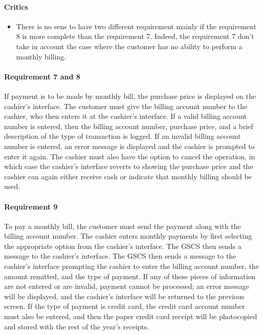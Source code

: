 \begin{framed}
    \paragraph{Critics} 
    \begin{itemize}
        \item There is no sens to have two different requirement mainly
            if the requirement 8 is more complete than the requirement
            7. Indeed, the requirement 7 don't take in account the
            case where the customer has no ability to perform a
            monthly billing.
    \end{itemize}

    \paragraph{Requirement 7 and 8} If payment is to be made by monthly bill, the
    purchase price is displayed on the cashier's interface.
    The customer must give the billing account number
    to the cashier, who then enters it at the cashier's interface. If a valid
    billing account number is entered, then the billing account number, purchase
    price, and a brief description of the type of transaction is logged. If an
    invalid billing account number is entered, an error message is displayed
    and the cashier is prompted to enter it again. The cashier must also have
    the option to cancel the operation, in which case the cashier's interface
    reverts to showing the purchase price and the cashier can again either
    receive cash or indicate that monthly billing should be used.
\end{framed}

\paragraph{Requirement 9} To pay a monthly bill, the customer must send
the payment along with the billing account number. The cashier enters
monthly payments by first selecting the appropriate option from the
cashier's interface. The GSCS then sends a message to the cashier's
interface. The GSCS then sends a message to the cashier's interface
prompting the cashier to enter the billing account number, the amount
remitted, and the type of payment. If any of these pieces of information
are not entered or are invalid, payment cannot be processed; an error
message will be displayed, and the cashier's interface will be returned
to the previous screen. If the type of payment is credit card, the credit
card account number must also be entered, and then the paper credit card
receipt will be photocopied and stored with the rest of the year's receipts.

